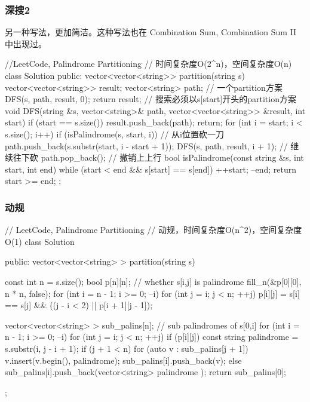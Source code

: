 \subsubsection{深搜2}
另一种写法，更加简洁。这种写法也在 Combination Sum, Combination Sum II 中出现过。
\begin{Code}
//LeetCode, Palindrome Partitioning
// 时间复杂度O(2^n)，空间复杂度O(n)
class Solution {
public:
    vector<vector<string>> partition(string s) {
        vector<vector<string>> result;
        vector<string> path;  // 一个partition方案
        DFS(s, path, result, 0);
        return result;
    }
    // 搜索必须以s[start]开头的partition方案
    void DFS(string &s, vector<string>& path,
            vector<vector<string>> &result, int start) {
        if (start == s.size()) {
            result.push_back(path);
            return;
        }
        for (int i = start; i < s.size(); i++) {
            if (isPalindrome(s, start, i)) { // 从i位置砍一刀
                path.push_back(s.substr(start, i - start + 1));
                DFS(s, path, result, i + 1);  // 继续往下砍
                path.pop_back(); // 撤销上上行
            }
        }
    }
    bool isPalindrome(const string &s, int start, int end) {
        while (start < end && s[start] == s[end]) {
            ++start;
            --end;
        }
        return start >= end;
    }
};
\end{Code}


\subsubsection{动规}
\begin{Code}
// LeetCode, Palindrome Partitioning
// 动规，时间复杂度O(n^2)，空间复杂度O(1)
class Solution {
public:
    vector<vector<string> > partition(string s) {
        const int n = s.size();
        bool p[n][n]; // whether s[i,j] is palindrome
        fill_n(&p[0][0], n * n, false);
        for (int i = n - 1; i >= 0; --i)
            for (int j = i; j < n; ++j)
                p[i][j] = s[i] == s[j] && ((j - i < 2) || p[i + 1][j - 1]);

        vector<vector<string> > sub_palins[n]; // sub palindromes of s[0,i]
        for (int i = n - 1; i >= 0; --i) {
            for (int j = i; j < n; ++j)
                if (p[i][j]) {
                    const string palindrome = s.substr(i, j - i + 1);
                    if (j + 1 < n) {
                        for (auto v : sub_palins[j + 1]) {
                            v.insert(v.begin(), palindrome);
                            sub_palins[i].push_back(v);
                        }
                    } else {
                        sub_palins[i].push_back(vector<string> { palindrome });
                    }
                }
        }
        return sub_palins[0];
    }
};
\end{Code}


